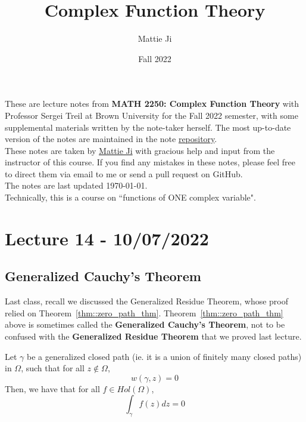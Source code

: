 \documentclass{article}
\title{Complex Function Theory}
\author{Mattie Ji}
\date{Fall 2022}
\begin{document}
\maketitle
These are lecture notes from \textbf{MATH 2250: Complex Function Theory} with Professor Sergei Treil at Brown University for the Fall 2022 semester, with some supplemental materials written by the note-taker herself. The most up-to-date version of the notes are maintained in the note \href{https://github.com/maroon-scorch/MATH2550-notes}{repository}.\\

These notes are taken by \href{https://github.com/maroon-scorch}{Mattie Ji} with gracious help and input from the instructor of this course. If you find any mistakes in these notes, please feel free to direct them via email to me or send a pull request on GitHub.\\

The notes are last updated \today.\\

Technically, this is a course on ``functions of ONE complex variable".
\tableofcontents
\newpage















\section{Lecture 14 - 10/07/2022}

\subsection{Generalized Cauchy's Theorem}

Last class, recall we discussed the Generalized Residue Theorem, whose proof relied on Theorem~\ref{thm::zero_path_thm}. 
 Theorem~\ref{thm::zero_path_thm} above is sometimes called the \textbf{Generalized Cauchy's Theorem}, not to be confused with the \textbf{Generalized Residue Theorem} that we proved last lecture.

\begin{theorem}
    Let $\gamma$ be a generalized closed path (ie. it is a union of finitely many closed paths) in $\Omega$, such that for all $z \notin \Omega$,
    \[w(\gamma, z) = 0\]
    Then, we have that for all $f \in Hol(\Omega)$,
    \[\int_\gamma f(z) dz = 0\]
\end{theorem}
\end{document}
